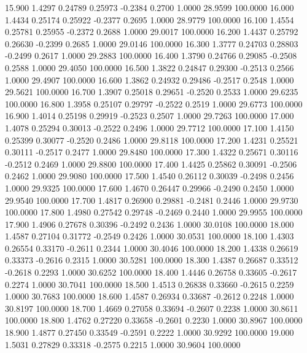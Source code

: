   15.900   1.4297   0.24789   0.25973  -0.2384   0.2700   1.0000  28.9599 100.0000
  16.000   1.4434   0.25174   0.25922  -0.2377   0.2695   1.0000  28.9779 100.0000
  16.100   1.4554   0.25781   0.25955  -0.2372   0.2688   1.0000  29.0017 100.0000
  16.200   1.4437   0.25792   0.26630  -0.2399   0.2685   1.0000  29.0146 100.0000
  16.300   1.3777   0.24703   0.28803  -0.2499   0.2617   1.0000  29.2883 100.0000
  16.400   1.3790   0.24766   0.29085  -0.2508   0.2588   1.0000  29.4050 100.0000
  16.500   1.3822   0.24847   0.29300  -0.2513   0.2566   1.0000  29.4907 100.0000
  16.600   1.3862   0.24932   0.29486  -0.2517   0.2548   1.0000  29.5621 100.0000
  16.700   1.3907   0.25018   0.29651  -0.2520   0.2533   1.0000  29.6235 100.0000
  16.800   1.3958   0.25107   0.29797  -0.2522   0.2519   1.0000  29.6773 100.0000
  16.900   1.4014   0.25198   0.29919  -0.2523   0.2507   1.0000  29.7263 100.0000
  17.000   1.4078   0.25294   0.30013  -0.2522   0.2496   1.0000  29.7712 100.0000
  17.100   1.4150   0.25399   0.30077  -0.2520   0.2486   1.0000  29.8118 100.0000
  17.200   1.4231   0.25521   0.30111  -0.2517   0.2477   1.0000  29.8480 100.0000
  17.300   1.4322   0.25671   0.30116  -0.2512   0.2469   1.0000  29.8800 100.0000
  17.400   1.4425   0.25862   0.30091  -0.2506   0.2462   1.0000  29.9080 100.0000
  17.500   1.4540   0.26112   0.30039  -0.2498   0.2456   1.0000  29.9325 100.0000
  17.600   1.4670   0.26447   0.29966  -0.2490   0.2450   1.0000  29.9540 100.0000
  17.700   1.4817   0.26900   0.29881  -0.2481   0.2446   1.0000  29.9730 100.0000
  17.800   1.4980   0.27542   0.29748  -0.2469   0.2440   1.0000  29.9955 100.0000
  17.900   1.4906   0.27678   0.30396  -0.2492   0.2436   1.0000  30.0108 100.0000
  18.000   1.4587   0.27104   0.31772  -0.2549   0.2426   1.0000  30.0531 100.0000
  18.100   1.4303   0.26554   0.33170  -0.2611   0.2344   1.0000  30.4046 100.0000
  18.200   1.4338   0.26619   0.33373  -0.2616   0.2315   1.0000  30.5281 100.0000
  18.300   1.4387   0.26687   0.33512  -0.2618   0.2293   1.0000  30.6252 100.0000
  18.400   1.4446   0.26758   0.33605  -0.2617   0.2274   1.0000  30.7041 100.0000
  18.500   1.4513   0.26838   0.33660  -0.2615   0.2259   1.0000  30.7683 100.0000
  18.600   1.4587   0.26934   0.33687  -0.2612   0.2248   1.0000  30.8197 100.0000
  18.700   1.4669   0.27058   0.33694  -0.2607   0.2238   1.0000  30.8611 100.0000
  18.800   1.4762   0.27220   0.33658  -0.2601   0.2230   1.0000  30.8967 100.0000
  18.900   1.4877   0.27450   0.33549  -0.2591   0.2222   1.0000  30.9292 100.0000
  19.000   1.5031   0.27829   0.33318  -0.2575   0.2215   1.0000  30.9604 100.0000
